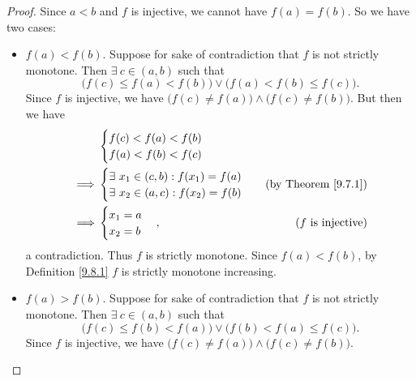 \begin{proof}
    Since \(a < b\) and \(f\) is injective, we cannot have \(f(a) = f(b)\).
    So we have two cases:
    \begin{itemize}
        \item \(f(a) < f(b)\).
              Suppose for sake of contradiction that \(f\) is not strictly monotone.
              Then \(\exists\ c \in (a, b)\) such that
              \[
                  \big(f(c) \leq f(a) < f(b)\big) \lor \big(f(a) < f(b) \leq f(c)\big).
              \]
              Since \(f\) is injective, we have \(\big(f(c) \neq f(a)\big) \land \big(f(c) \neq f(b)\big)\).
              But then we have
              \begin{align*}
                           & \begin{cases}
                                 f(c) < f(a) < f(b) \\
                                 f(a) < f(b) < f(c)
                             \end{cases}                                                      \\
                  \implies & \begin{cases}
                                 \exists\ x_1 \in (c, b) : f(x_1) = f(a) \\
                                 \exists\ x_2 \in (a, c) : f(x_2) = f(b) \\
                             \end{cases} & \text{(by Theorem \ref{9.7.1})}                           \\
                  \implies & \begin{cases}
                                 x_1 = a \\
                                 x_2 = b
                             \end{cases},                              & \text{(\(f\) is injective)}
              \end{align*}
              a contradiction.
              Thus \(f\) is strictly monotone.
              Since \(f(a) < f(b)\), by Definition \ref{9.8.1} \(f\) is strictly monotone increasing.
        \item \(f(a) > f(b)\).
              Suppose for sake of contradiction that \(f\) is not strictly monotone.
              Then \(\exists\ c \in (a, b)\) such that
              \[
                  \big(f(c) \leq f(b) < f(a)\big) \lor \big(f(b) < f(a) \leq f(c)\big).
              \]
              Since \(f\) is injective, we have \(\big(f(c) \neq f(a)\big) \land \big(f(c) \neq f(b)\big)\).

\end{itemize}
\end{proof}
